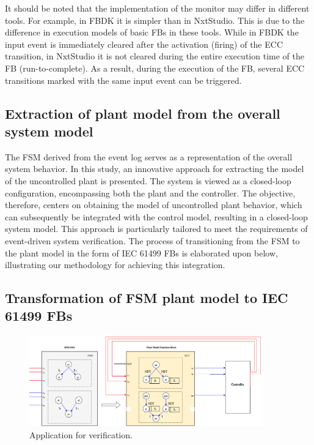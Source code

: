 \begin{bibunit}
It should be noted that the implementation of the monitor may differ in different tools. For example, in FBDK \cite{holobloc} it is simpler than in NxtStudio. This is due to the difference in execution models of basic FBs in these tools. While in FBDK the input event is immediately cleared after the activation (firing) of the ECC transition, in NxtStudio it is not cleared during the entire execution time of the FB (run-to-complete). As a result, during the execution of the FB, several ECC transitions marked with the same input event can be triggered.



\subsection{Extraction of plant model from the overall system model}

The FSM derived from the event log serves as a representation of the overall system behavior. In this study, an innovative approach for extracting the model of the uncontrolled plant is presented. The system is viewed as a closed-loop configuration, encompassing both the plant and the controller. The objective, therefore, centers on obtaining the model of uncontrolled plant behavior, which can subsequently be integrated with the control model, resulting in a closed-loop system model. This approach is particularly tailored to meet the requirements of event-driven system verification. The process of transitioning from the FSM to the plant model in the form of IEC 61499 FBs is elaborated upon below, illustrating our methodology for achieving this integration.

\subsection{Transformation of FSM plant model to IEC 61499 FBs }

\label{subsec:transformationOfFSMtoFB}

\begin{figure}[!t]
	\centering
	\includegraphics[width=0.9\textwidth]{MX_Papers/Paper7/images/VerificationApp1.png}
	\caption{Application for verification.}
	\label{verificationApp}
\end{figure}



\end{bibunit}
